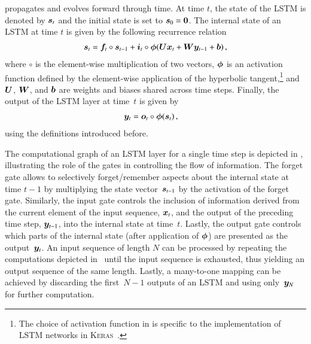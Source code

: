 propagates and evolves forward through time. At time $t$, the state of the LSTM
is denoted by $\bm{s}_{t}$ and the initial state is set to
$\bm{s}_{0} = \bm{0}$. The internal state of an LSTM at time $t$ is given
by the following recurrence relation~\cite{Goodfellow-et-al-2016,keras}
\begin{align}
  \bm{s}_{t} = \bm{f}_{t} \circ \bm{s}_{t - 1}
  + \bm{i}_{t} \circ \bm{\phi}(\bm{U} \bm{x}_{t} + \bm{W} \bm{y}_{t-1} + \bm{b}) \,\text{,}
  \label{eq:lstm_state_update}
\end{align}
where $\circ$ is the element-wise multiplication of two vectors, $\bm{\phi}$
is an activation function defined by the element-wise application of the
hyperbolic tangent,\footnote{The choice of activation function in
   is specific to the implementation of LSTM networks
  in \textsc{Keras}~\cite{keras}.} and $\bm{U}$, $\bm{W}$, and $\bm{b}$
are weights and biases shared across time steps. Finally, the output of the LSTM
layer at time~$t$ is given by~\cite{Goodfellow-et-al-2016}
\begin{align}
  &\bm{y}_{t} = \bm{o}_{t} \circ \bm{\phi}(\bm{s}_{t}) \,\text{,}
  \label{eq:lstm_output}
\end{align}
using the definitions introduced before.

The computational graph of an LSTM layer for a single time step is depicted in
, illustrating the role of the gates in controlling the flow of
information. The forget gate allows to selectively forget/remember aspects about
the internal state at time $t - 1$ by multiplying the state
vector~$\bm{s}_{t - 1}$ by the activation of the forget gate. Similarly, the
input gate controls the inclusion of information derived from the current
element of the input sequence, $\bm{x}_{t}$, and the output of the preceding
time step, $\bm{y}_{t - 1}$, into the internal state at time~$t$. Lastly, the
output gate controls which parts of the internal state (after application of
$\bm{\phi}$) are presented as the output~$\bm{y}_{t}$. An input sequence
of length $N$ can be processed by repeating the computations depicted
in~ until the input sequence is exhausted, thus yielding an
output sequence of the same length. Lastly, a many-to-one mapping can be
achieved by discarding the first~$N - 1$ outputs of an LSTM and using
only~$\bm{y}_{N}$ for further computation.

